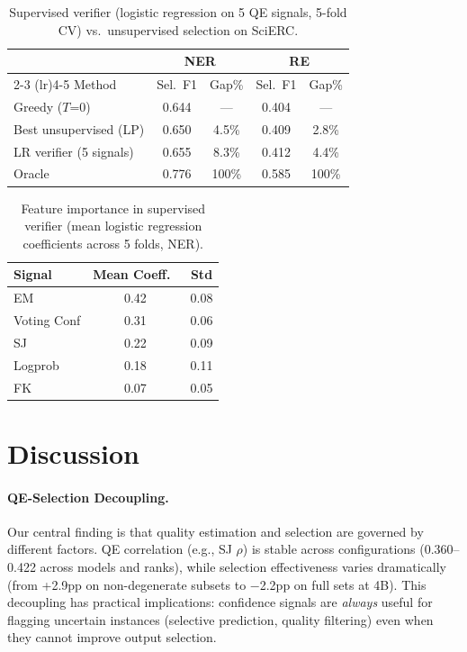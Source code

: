 \documentclass[11pt,a4paper]{article}
\begin{document}
\begin{table}[t]
\centering
\small
\caption{Supervised verifier (logistic regression on 5 QE signals, 5-fold CV) vs.\ unsupervised selection on SciERC.}
\label{tab:verifier}
\begin{tabular}{@{}l cccc@{}}
\toprule
& \multicolumn{2}{c}{\textbf{NER}} & \multicolumn{2}{c}{\textbf{RE}} \\
\cmidrule(lr){2-3} \cmidrule(lr){4-5}
Method & Sel.\ F1 & Gap\% & Sel.\ F1 & Gap\% \\
\midrule
Greedy ($T$=0) & 0.644 & --- & 0.404 & --- \\
Best unsupervised (LP) & 0.650 & 4.5\% & 0.409 & 2.8\% \\
LR verifier (5 signals) & 0.655 & 8.3\% & 0.412 & 4.4\% \\
\midrule
Oracle & 0.776 & 100\% & 0.585 & 100\% \\
\bottomrule
\end{tabular}
\end{table}

\begin{table}[t]
\centering
\small
\caption{Feature importance in supervised verifier (mean logistic regression coefficients across 5 folds, NER).}
\label{tab:feat_importance}
\begin{tabular}{@{}l cc@{}}
\toprule
Signal & Mean Coeff.\ & Std \\
\midrule
EM & 0.42 & 0.08 \\
Voting Conf & 0.31 & 0.06 \\
SJ & 0.22 & 0.09 \\
Logprob & 0.18 & 0.11 \\
FK & 0.07 & 0.05 \\
\bottomrule
\end{tabular}
\end{table}

\section{Discussion}

\paragraph{QE-Selection Decoupling.}
Our central finding is that quality estimation and selection are governed by different factors.
QE correlation (e.g., SJ $\rho$) is stable across configurations (0.360--0.422 across models and ranks), while selection effectiveness varies dramatically (from +2.9pp on non-degenerate subsets to $-$2.2pp on full sets at 4B).
This decoupling has practical implications: confidence signals are \emph{always} useful for flagging uncertain instances (selective prediction, quality filtering) even when they cannot improve output selection.
\end{document}
